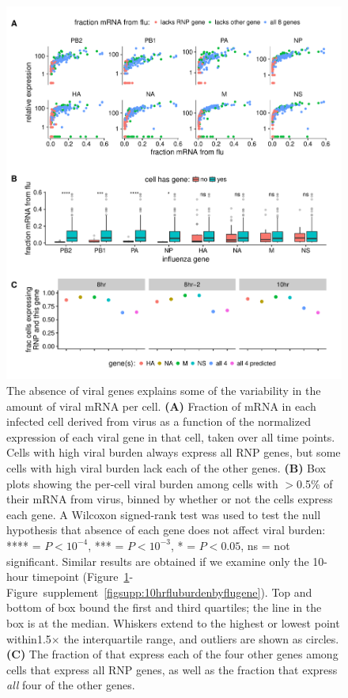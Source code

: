 \documentclass[9pt,lineno]{elife}
\begin{document}
\begin{figure}[t!]
\centerline{\includegraphics[width=0.9\linewidth]{figures/p_flu_burden_flu_gene_merge.pdf}}
\caption{\label{fig:fluburdenbyflugene}
The absence of viral genes explains some of the variability in the amount of viral mRNA per cell.
{\bf (A)} 
Fraction of mRNA in each infected cell derived from virus as a function of the normalized expression of each viral gene in that cell, taken over all time points.
Cells with high viral burden always express all RNP genes, but some cells with high viral burden lack each of the other genes.
{\bf (B)}
Box plots showing the per-cell viral burden among cells with $>$0.5\% of their mRNA from virus, binned by whether or not the cells express each gene.
A Wilcoxon signed-rank test was used to test the null hypothesis that absence of each gene does not affect viral burden: **** = $P < 10^{-4}$, *** = $P < 10^{-3}$,  * = $P < 0.05$, ns = not significant.
Similar results are obtained if we examine only the 10-hour timepoint (Figure~\ref{fig:fluburdenbyflugene}-Figure~supplement~\ref{figsupp:10hrfluburdenbyflugene}).
Top and bottom of box bound the first and third quartiles; the line in the box is at the median.
Whiskers extend to the highest or lowest point within1.5$\times$ the interquartile range, and outliers are shown as circles.
{\bf (C)}
The fraction of that express each of the four other genes among cells that express all RNP genes, as well as the fraction that express \emph{all} four of the other genes.
}
\end{figure}
\end{document}
